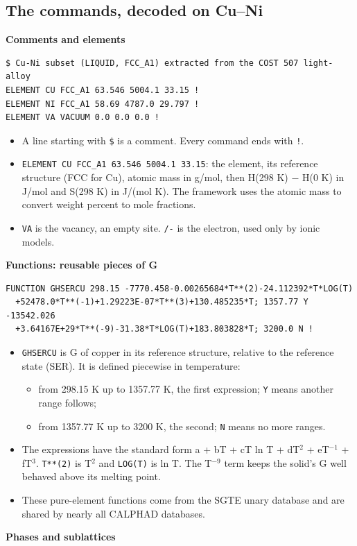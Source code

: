 \documentclass[12pt,a4paper]{article}
\begin{document}
\subsection*{The commands, decoded on Cu--Ni}
\textbf{Comments and elements}

\begin{lstlisting}[basicstyle={\footnotesize\ttfamily}]
$ Cu-Ni subset (LIQUID, FCC_A1) extracted from the COST 507 light-alloy
ELEMENT CU FCC_A1 63.546 5004.1 33.15 !
ELEMENT NI FCC_A1 58.69 4787.0 29.797 !
ELEMENT VA VACUUM 0.0 0.0 0.0 !
\end{lstlisting}
\begin{itemize}
\item A line starting with \texttt{\$} is a comment. Every command ends with \texttt{!}.
\item \texttt{ELEMENT CU FCC\_\allowbreak{}A1 63.\allowbreak{}546 5004.\allowbreak{}1 33.\allowbreak{}15}: the element, its reference structure (FCC for Cu), atomic mass in g/mol, then H(298 K) \(-\) H(0 K) in J/mol and S(298 K) in J/(mol K). The framework uses the atomic mass to convert weight percent to mole fractions.
\item \texttt{VA} is the vacancy, an empty site. \texttt{/\allowbreak{}-{}} is the electron, used only by ionic models.
\end{itemize}
\textbf{Functions: reusable pieces of G}

\begin{lstlisting}[basicstyle={\footnotesize\ttfamily}]
FUNCTION GHSERCU 298.15 -7770.458-0.00265684*T**(2)-24.112392*T*LOG(T)
  +52478.0*T**(-1)+1.29223E-07*T**(3)+130.485235*T; 1357.77 Y -13542.026
  +3.64167E+29*T**(-9)-31.38*T*LOG(T)+183.803828*T; 3200.0 N !
\end{lstlisting}
\begin{itemize}
\item \texttt{GHSERCU} is G of copper in its reference structure, relative to the reference state (SER). It is defined piecewise in temperature:
\begin{itemize}
\item from 298.15 K up to 1357.77 K, the first expression; \texttt{Y} means another range follows;
\item from 1357.77 K up to 3200 K, the second; \texttt{N} means no more ranges.
\end{itemize}
\item The expressions have the standard form a + bT + cT ln T + dT\(^{2}\) + eT\(^{-1}\) + fT\(^{3}\). \texttt{T**(2)} is T\(^{2}\) and \texttt{LOG(T)} is ln T. The T\(^{-9}\) term keeps the solid's G well behaved above its melting point.
\item These pure-element functions come from the SGTE unary database and are shared by nearly all CALPHAD databases.
\end{itemize}
\textbf{Phases and sublattices}
\end{document}
